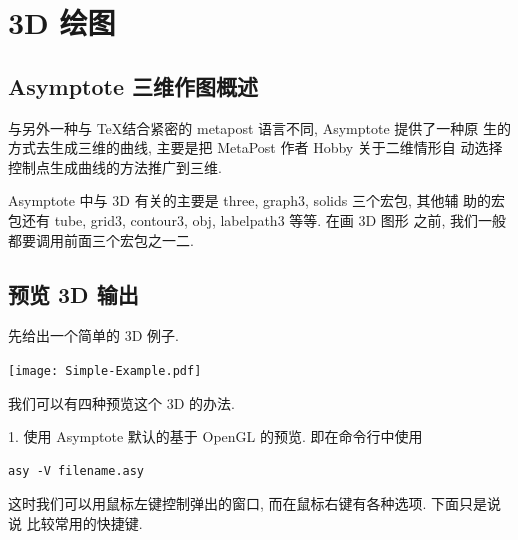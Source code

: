 \documentclass[nofonts,CJKnormalspaces]{ctexbook}
\begin{document}
\chapter{3D 绘图}

\section{Asymptote 三维作图概述 }

与另外一种与 \TeX 结合紧密的 metapost 语言不同, Asymptote 提供了一种原
生的方式去生成三维的曲线, 主要是把 MetaPost 作者 Hobby 关于二维情形自
动选择控制点生成曲线的方法推广到三维.

Asymptote 中与 3D 有关的主要是 three, graph3, solids  三个宏包, 其他辅
助的宏包还有 tube, grid3, contour3, obj, labelpath3 等等. 在画 3D 图形
之前, 我们一般都要调用前面三个宏包之一二.

 \section{预览 3D 输出}
先给出一个简单的 3D 例子.
\begin{center}\texttt{[image: Simple-Example.pdf]}\end{center}%

我们可以有四种预览这个 3D 的办法.

1. 使用 Asymptote 默认的基于 OpenGL 的预览. 即在命令行中使用
\begin{verbatim}
asy -V filename.asy
\end{verbatim}

这时我们可以用鼠标左键控制弹出的窗口, 而在鼠标右键有各种选项. 下面只是说说
比较常用的快捷键.
\end{document}
